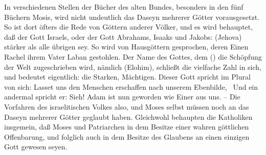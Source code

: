 In verschiedenen Stellen der Bücher des alten Bundes, besonders in den fünf Büchern Mosis, wird nicht undeutlich das Daseyn mehrerer Götter vorausgesetzt. So ist dort öfters die Rede von Göttern anderer Völker, und es wird behauptet, daß der Gott Israels, oder der Gott Abrahams, Isaaks und Jakobs:  (Jehova) stärker als alle übrigen sey. So wird von Hausgöttern gesprochen, deren Einen Rachel ihrem Vater Laban gestohlen. Der Name des Gottes, dem () die Schöpfung der Welt zugeschrieben wird, nämlich  (Elohim), schließt die vielfache Zahl in sich, und bedeutet eigentlich: die Starken, Mächtigen. Dieser Gott spricht im Plural von sich: Lasset uns den Menschen erschaffen nach unserem Ebenbilde, \usw\ Und ein andermal spricht er: Sieh! Adam ist nun geworden wie Einer aus uns. -- Die Vorfahren des israelitischen Volkes also, und Moses selbst müssen noch an das Daseyn mehrerer Götter geglaubt haben. Gleichwohl behaupten die Katholiken insgemein, daß Moses und Patriarchen in dem Besitze einer wahren göttlichen Offenbarung, und folglich auch in dem Besitze des Glaubens an einen einzigen Gott gewesen seyen.\par
{}
